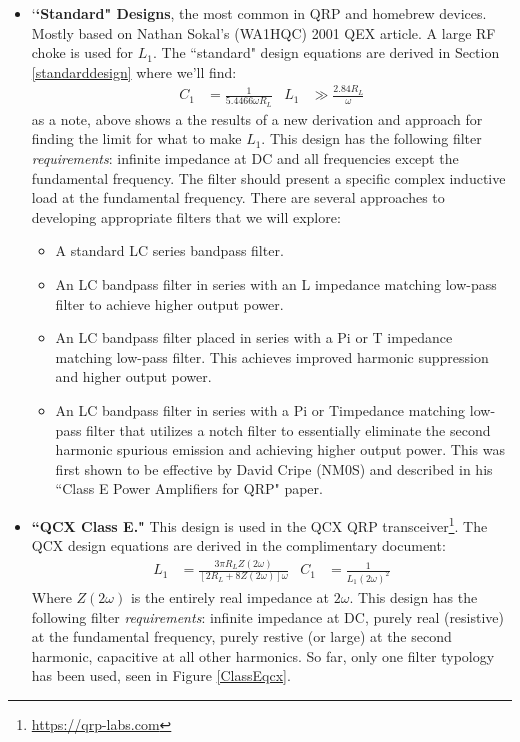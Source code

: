 \documentclass[10pt,letterpaper]{article}
\begin{document}
\begin{itemize}
\item `\textbf{`Standard" Designs}, the most common in QRP and homebrew devices. Mostly based on Nathan Sokal's (WA1HQC) 2001 QEX article. A large RF choke is used for $L_1$. The ``standard" design equations are derived in Section \ref{standarddesign} where we'll find:
\begin{align*}
C_1 &= \frac{1}{5.4466\omega R_L} &L_1 &\gg \frac{2.84 R_L}{\omega}
\end{align*}
as a note, above shows a the results of a new derivation  and approach for finding the limit for what to make $L_1$. This design has the following filter \textit{requirements}: infinite impedance at DC and all frequencies except the fundamental frequency. The filter should present a specific complex inductive load at the fundamental frequency. There are several approaches to developing appropriate filters that we will explore:
\begin{itemize}
\item A standard LC series bandpass filter.
\item An LC bandpass filter in series with an L impedance matching low-pass filter to achieve higher output power.
\item An LC bandpass filter placed in series with a Pi or T impedance matching low-pass filter. This achieves improved harmonic suppression and higher output power.
\item An LC bandpass filter in series with a Pi or Timpedance matching low-pass filter that utilizes a notch filter to essentially eliminate the second harmonic spurious emission and achieving higher output power. This was first shown to be effective by David Cripe (NM0S) and described in his ``Class E Power Amplifiers for QRP" paper.
\end{itemize}
\item \textbf{``QCX Class E."} This design is used in the QCX QRP transceiver\footnote{\url{https://qrp-labs.com}}. The QCX design equations are derived in the complimentary document:
\begin{align*}
L_1&=\frac{3 \pi R_L Z(2\omega) }{[2R_L+8Z(2\omega)]\omega}
& C_1&=\frac{1}{L_1 (2\omega)^2}
\end{align*}
Where $Z(2\omega)$ is the entirely real impedance at $2\omega$. This design has the following filter \textit{requirements}: infinite impedance at DC, purely real (resistive) at the fundamental frequency, purely restive (or large) at the second harmonic, capacitive at all other harmonics. So far, only one filter typology has been used, seen in Figure \ref{ClassEqcx}.
\end{itemize}
\end{document}
